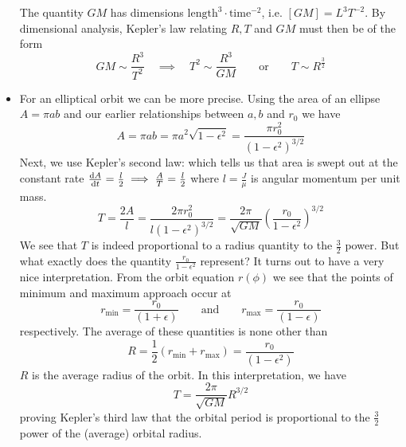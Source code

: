\documentclass[11pt, a4paper]{article}
\newcommand{\eqtext}[1]{\qquad \text{#1} \qquad}
\begin{document}
\begin{itemize}
	The quantity $ GM $ has dimensions $ \text{length}^{3} \cdot \text{time}^{-2} $, i.e. $ [GM] = L^{3} T^{-2} $. By dimensional analysis, Kepler's law relating $ R, T $ and $ GM $ must then be of the form
	\begin{equation*}
		GM \sim \frac{R^{3}}{T^{2}} \quad \implies \quad T^{2} \sim \frac{R^{3}}{GM} \eqtext{or} T \sim R^{\frac{3}{2}}
	\end{equation*}
	
	\item For an elliptical orbit we can be more precise. Using the area of an ellipse $ A = \pi a b $ and our earlier relationships between $ a, b $ and $ r_{0} $ we have
	\begin{equation*}
		A = \pi a b = \pi a^{2} \sqrt{1 - \epsilon^{2}} = \frac{\pi r_{0}^{2}}{(1 - \epsilon^{2})^{3/2}}
	\end{equation*}
	Next, we use Kepler's second law: which tells us that area is swept out at the constant rate $ \dv{A}{t} = \frac{l}{2} \implies \frac{A}{T} = \frac{l}{2}  $ where $ l = \frac{J}{\mu}$ is angular momentum per unit mass. 
	\begin{equation*}
		T = \frac{2A}{l} = \frac{2\pi r_{0}^{2}}{l(1 - \epsilon^{2})^{3/2}} = \frac{2\pi}{\sqrt{GM}} \left(\frac{r_{0}}{1-\epsilon^{2}}\right)^{3/2}
	\end{equation*}
	We see that $ T $ is indeed proportional to a radius quantity to the $ \frac{3}{2} $ power. But what exactly does the quantity $  \frac{r_{0}}{1-\epsilon^{2}}$ represent? It turns out to have a very nice interpretation. From the orbit equation $ r(\phi) $ we see that the points of minimum and maximum approach occur at
	\begin{equation*}
		r_{\text{min}} = \frac{r_{0}}{(1 + \epsilon)} \eqtext{and} r_{\text{max}} = \frac{r_{0}}{(1 - \epsilon)}
	\end{equation*}
	respectively. The average of these quantities is none other than
	\begin{equation*}
		R = \frac{1}{2}(r_{\text{min}} + r_{\text{max}}) = \frac{r_{0}}{(1-\epsilon^{2})}
	\end{equation*}
	$ R $ is the average radius of the orbit. In this interpretation, we have
	\begin{equation*}
		T = \frac{2\pi}{\sqrt{GM}} R^{3/2}
	\end{equation*}
	proving Kepler's third law that the orbital period is proportional to the $ \frac{3}{2} $ power of the (average) orbital radius.
	
	
\end{itemize}
\end{document}
